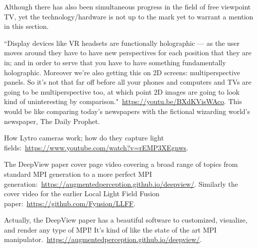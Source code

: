 Although there has also been simultaneous progress in the field of free viewpoint TV, yet the technology/hardware is not up to the mark yet to warrant a mention in this section.

``Display devices like VR headsets are functionally holographic --- as the user moves around they have to have new perspectives for each position that they are in; and in order to serve that you have to have something fundamentally holographic. Moreover we're also getting this on 2D screens: multiperspective panels. So it's not that far off before all your phones and computers and TVs are going to be multiperspective too, at which point 2D images are going to look kind of uninteresting by comparison."~\url{https://youtu.be/BXdKVisWAco}. This would be like comparing today's newspapers with the fictional wizarding world's newspaper, The Daily Prophet.

How Lytro cameras work; how do they capture light fields:~\url{https://www.youtube.com/watch?v=rEMP3XEgnws}.

The DeepView paper cover page video covering a broad range of topics from standard MPI generation to a more perfect MPI generation:~\url{https://augmentedperception.github.io/deepview/}. Similarly the cover video for the earlier Local Light Field Fusion paper:~\url{https://github.com/Fyusion/LLFF}. 

Actually, the DeepView paper has a beautiful software to customized, visualize, and render any type of MPI! It's kind of like the state of the art MPI manipulator.~\url{https://augmentedperception.github.io/deepview/}.

